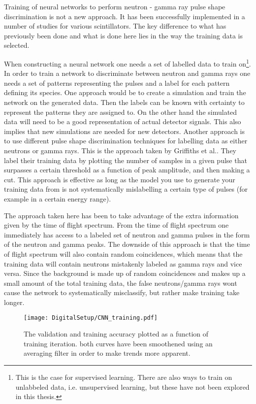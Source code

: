 \documentclass[main.tex]{subfiles}
\begin{document}
Training of neural networks to perform neutron - gamma ray pulse shape discrimination is not a new approach. It has been successfully implemented in a number of studies for various scintillators. The key difference to what has previously been done and what is done here lies in the way the training data is selected.

When constructing a neural network one needs a set of labelled data to train on\footnote{This is the case for supervised learning. There are also ways to train on unlabbeled data, i.e. unsupervised learning, but these have not been explored in this thesis.}. In order to train a network to discriminate between neutron and gamma rays one needs a set of patterns representing the pulses and a label for each pattern defining its species. One approach would be to create a simulation and train the network on the generated data. Then the labels can be known with certainty to represent the patterns they are assigned to. On the other hand the simulated data will need to be a good representation of actual detector signals. This also implies that new simulations are needed for new detectors. Another approach is to use different pulse shape discrimination techniques for labelling data as either neutrons or gamma rays. This is the approach taken by  Griffiths et al.\cite{Griffiths}. They label their training data by plotting the number of samples in a given pulse that surpasses a certain threshold as a function of peak amplitude, and then making a cut. This approach is effective as long as the model you use to generate your training data from is not systematically mislabelling a certain type of pulses (for example in a certain energy range). 

The approach taken here has been to take advantage of the extra information given by the time of flight spectrum. From the time of flight spectrum one immediately has access to a labeled set of neutron and gamma pulses in the form of the neutron and gamma peaks. The downside of this approach is that the time of flight spectrum will also contain random coincidences, which means that the training data will contain neutrons mistakenly labeled as gamma rays and vice versa. Since the background is made up of random coincidences and makes up a small amount of the total training data, the false neutrons/gamma rays wont cause the network to systematically misclassify, but rather make training take longer.

\begin{figure}[ht!]
    \centering
        \texttt{[image: DigitalSetup/CNN\_training.pdf]}
        \caption[Training and validation accuracy of the CNN]{The validation and training accuracy plotted as a function of training iteration. both curves have been smoothened using an averaging filter in order to make trends more apparent.}
    \label{fig:CNN_training} 
\end{figure}
\end{document}
